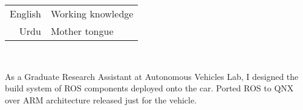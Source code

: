 \documentclass[theme]{cv_einstein}
\begin{document}
\begin{paracol}{2}
\begin{leftcolumn*}
{            
            \begin{minipage}[r]{\leftcolwidth}
                \begin{tabular}{r|l}
                    English & Working knowledge\\[0.3em]
                    Urdu & Mother tongue\\[0.3em]
                \end{tabular}
            \end{minipage}
            \vspace{\sectionspace}
        }
        \end{leftcolumn*}
        \begin{rightcolumn}\noindent \small
            \phantom{} \\ %
            {As a Graduate Research Assistant at Autonomous Vehicles Lab, I designed the build system of ROS components deployed onto the car. Ported ROS to QNX over ARM architecture released just for the vehicle. 
            
}
\end{rightcolumn}
\end{paracol}
\end{document}
